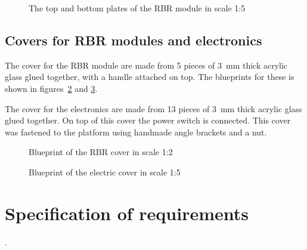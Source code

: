 \begin{figure}[htbp]
  \centering
  \caption{The top and bottom plates of the RBR module in scale 1:5}
  \label{fig:appendix-blueprint-rbr-module}

\end{figure}
\subsection{Covers for RBR modules and electronics}

The cover for the RBR module are made from 5 pieces of 3~mm thick acrylic glass
glued together, with a handle attached on top. The blueprints for these is shown in figures~\ref{fig:appendix-blueprint-rbr-cover} and \ref{fig:appendix-blueprint-electronic-cover}.

The cover for the electronics are made from 13 pieces of 3~mm thick acrylic glass
glued together. On top of this cover the power switch is connected. This cover
was fastened to the platform using handmade angle brackets and a nut.

\begin{figure}[htbp]
  \centering
  \caption{Blueprint of the RBR cover in scale 1:2}
  \label{fig:appendix-blueprint-rbr-cover}

\end{figure}
\begin{figure}[htbp]
  \centering
  \caption{Blueprint of the electric cover in scale 1:5}
  \label{fig:appendix-blueprint-electronic-cover}

\end{figure}



\section{Specification of requirements}\label{sec:appendix-b}
.
\label{kravspec}
